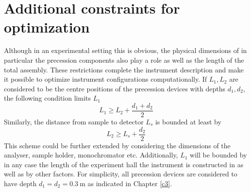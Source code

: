 
\section{Additional constraints for optimization}
\label{c5.1}
Although in an experimental setting this is obvious, the physical dimensions of in particular the precession components also play a role as well as the length of the total assembly. These restrictions complete the instrument description and make it possible to optimize instrument configurations computationally. If $L_1, L_2$ are considered to be the centre positions of the precession devices with depths $d_1, d_2$, the following condition limits $L_1$
$$L_1 \geq L_2 + \frac{d_1 + d_2}{2}$$
Similarly, the distance from sample to detector $L_s$ is bounded at least by
$$L_2 \geq L_s + \frac{d_2}{2}$$
This scheme could be further extended by considering the dimensions of the analyser, sample holder, monochromator etc. Additionally, $L_1$  will be bounded by in any case the length of the experiment hall the instrument is constructed in as well as by other factors. For simplicity, all precession devices are considered to have depth $d_1 = d_2 = \SI{0.3}{\meter}$ as indicated in Chapter \ref{c3}. 


